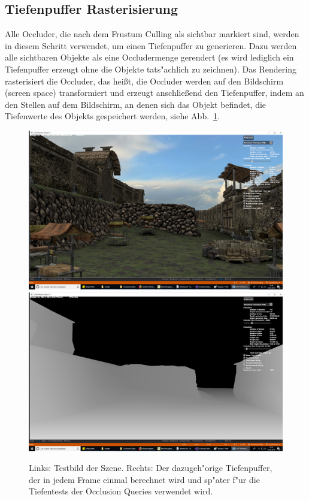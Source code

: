\documentclass[journal]{vgtc}
\begin{document}
\subsection{Tiefenpuffer Rasterisierung}
Alle Occluder, die nach dem Frustum Culling als sichtbar markiert sind, werden in diesem Schritt verwendet, um einen Tiefenpuffer zu generieren. Dazu werden alle sichtbaren Objekte als eine Occludermenge \glqq gerendert\grqq{} (es wird lediglich ein Tiefenpuffer erzeugt ohne die Objekte tats"achlich zu zeichnen). Das Rendering rasterisiert die Occluder, das hei{\ss}t, die Occluder werden auf den Bildschirm (screen space) transformiert und erzeugt anschlie{\ss}end den Tiefenpuffer, indem an den Stellen auf dem Bildschirm, an denen sich das Objekt befindet, die Tiefenwerte des Objekts gespeichert werden, siehe Abb.\ \ref{fig:db}.
\begin{figure}%
\includegraphics[width=0.5\columnwidth]{images/Base1.png}%
\includegraphics[width=0.5\columnwidth]{images/Base1DB.png}%
\caption{Links: Testbild der Szene. Rechts: Der dazugeh"orige Tiefenpuffer, der in jedem Frame einmal berechnet wird und sp"ater f"ur die Tiefentests der Occlusion Queries verwendet wird.}%
\label{fig:db}%
\end{figure}
\end{document}
